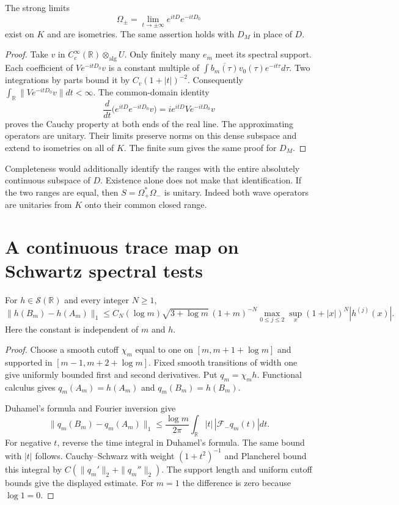 \begin{theorem}
\label{v4-arith:w7-j:prop:wave-existence}
The strong limits
\[
 \Omega_\pm=\lim_{t\to\pm\infty}e^{itD}e^{-itD_0}
\]
exist on $K$ and are isometries. The same assertion holds with
$D_M$ in place of $D$.
\end{theorem}
\begin{proof}
Take $v$ in $C_c^\infty(\mathbb R)\otimes_{\mathrm{alg}}U$.
Only finitely many $e_m$ meet its spectral support. Each coefficient
of $Ve^{-itD_0}v$ is a constant multiple of
$\int\overline{b_m(\tau)}v_0(\tau)e^{-it\tau}d\tau$.
Two integrations by parts bound it by $C_v(1+|t|)^{-2}$.
Consequently $\int_{\mathbb R}\|Ve^{-itD_0}v\|dt<\infty$.
The common-domain identity
\[
 \frac d{dt}\bigl(e^{itD}e^{-itD_0}v\bigr)
 =ie^{itD}Ve^{-itD_0}v
\]
proves the Cauchy property at both ends of the real line.
The approximating operators are unitary. Their limits preserve
norms on this dense subspace and extend to isometries on all of $K$.
The finite sum gives the same proof for $D_M$.
\end{proof}

Completeness would additionally identify the ranges with the entire
absolutely continuous subspace of $D$. Existence alone does not make
that identification. If the two ranges are equal, then
$S=\Omega_+^*\Omega_-$ is unitary. Indeed both wave operators are
unitaries from $K$ onto their common closed range.

\section{A continuous trace map on Schwartz spectral tests}

\begin{lemma}
\label{v4-arith:sc:trace-bound}
For $h\in\mathscr S(\mathbb R)$ and every integer $N\ge1$,
\[
 \|h(B_m)-h(A_m)\|_1
 \le C_N(\log m)\sqrt{3+\log m}\,(1+m)^{-N}
 \max_{0\le j\le2}\sup_x(1+|x|)^N|h^{(j)}(x)|.
\]
Here the constant is independent of $m$ and $h$.
\end{lemma}
\begin{proof}
Choose a smooth cutoff $\chi_m$ equal to one on
$[m,m+1+\log m]$ and supported in $[m-1,m+2+\log m]$.
Fixed smooth transitions of width one give uniformly bounded
first and second derivatives. Put $q_m=\chi_m h$.
Functional calculus gives $q_m(A_m)=h(A_m)$ and
$q_m(B_m)=h(B_m)$.

Duhamel's formula and Fourier inversion give
\[
 \|q_m(B_m)-q_m(A_m)\|_1
 \le\frac{\log m}{2\pi}
       \int_{\mathbb R}|t|\,|\mathcal F_-q_m(t)|dt.
\]
For negative $t$, reverse the time integral in Duhamel's formula.
The same bound with $|t|$ follows. Cauchy--Schwarz with weight
$(1+t^2)^{-1}$ and Plancherel bound this integral by
$C(\|q_m'\|_2+\|q_m''\|_2)$.
The support length and uniform cutoff bounds give the displayed
estimate. For $m=1$ the difference is zero because $\log1=0$.
\end{proof}

